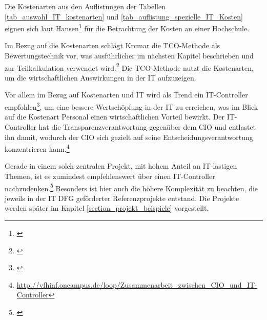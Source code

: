 Die Kostenarten aus den Auflistungen der Tabellen \ref{tab_auswahl_IT_kostenarten} und \ref{tab_auflistung_spezielle_IT_Kosten} eignen sich laut Hansen\footnote{\autocite[493-498]{hansen_business_2009}} für die Betrachtung der Kosten an einer Hochschule.

Im Bezug auf die Kostenarten schlägt Krcmar die TCO-Methode als Bewertungstechnik vor, was ausführlicher im nächsten Kapitel beschrieben und zur Teilkalkulation verwendet wird.\footnote{\autocite[144]{krcmar_einfuhrung_2015}} Die TCO-Methode nutzt die Kostenarten, um die wirtschaftlichen Auswirkungen in der IT aufzuzeigen.

\clearpage

Vor allem im Bezug auf Kostenarten und IT wird als Trend ein IT-Controller empfohlen\footnote{\autocite[49]{gadatsch_masterkurs_2014}}, um eine bessere Wertschöpfung in der IT zu erreichen, was im Blick auf die Kostenart Personal einen wirtschaftlichen Vorteil bewirkt. Der IT-Controller hat die Transparenzverantwortung gegenüber dem CIO und entlastet ihn damit, wodurch der CIO sich gezielt auf seine Entscheidungsverantwortung konzentrieren kann.\footnote{\url{http://vfhinf.oncampus.de/loop/Zusammenarbeit_zwischen_CIO_und_IT-Controller}} 

Gerade in einem solch zentralen Projekt, mit hohem Anteil an IT-lastigen Themen, ist es zumindest empfehlenswert über einen IT-Controller nachzudenken.\footnote{\autocite[11-15]{stratmann_it_2013}} Besonders ist hier auch die höhere Komplexität zu beachten, die jeweils in der IT DFG geförderter Referenzprojekte entstand. Die Projekte werden später im Kapitel \ref{section_projekt_beispiele} vorgestellt.

